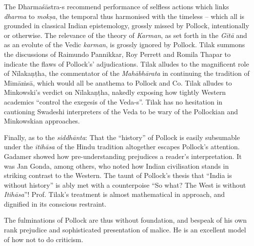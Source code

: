 \vskip 2pt

The Dharmaśāstra-s recommend performance of selfless actions which links \textit{dharma} to \textit{mokṣa}, the temporal thus harmonised with the timeless – which all is grounded in classical Indian epistemology, grossly missed by Pollock, intentionally or otherwise. The relevance of the theory of \textit{Karman}, as set forth in the \textit{Gītā} and as an evolute of the Vedic \textit{karman}, is grossly ignored by Pollock. Tilak summons the discussions of Raimundo Pannikkar, Roy Perrett and Romila Thapar to indicate the flaws of Pollock’s’ adjudications. Tilak alludes to the magnificent role of Nīlakaṇṭha, the commentator of the \textit{Mahābhārata} in continuing the tradition of Mīmāṁsā, which would all be anathema to Pollock and Co. Tilak alludes to Minkowski’s verdict on Nīlakaṇṭha, nakedly exposing how tightly Western academics ``control the exegesis of the Veda-s”. Tilak has no hesitation in cautioning Swadeshi interpreters of the Veda to be wary of the Pollockian and Minkowskian approaches.

\vskip 2pt

Finally, as to the \textit{siddhānta}: That the “history” of Pollock is easily subsumable under the \textit{itihāsa} of the Hindu tradition altogether escapes Pollock's attention. Gadamer showed how pre-understanding prejudices a reader’s interpretation. It was Jan Gonda, among others, who noted how Indian civilisation stands in striking contrast to the Western. The taunt of Pollock’s thesis that “India is without history” is ably met with a counterpoise “So what? The West is without \textit{Itihāsa}”! Prof. Tilak’s treatment is almost mathematical in approach, and dignified in its conscious restraint. 

\vskip 2pt

The fulminations of Pollock are thus without foundation, and bespeak of his own rank prejudice and sophisticated presentation of malice. He is an excellent model of how not to do criticism.

\vskip 2pt

